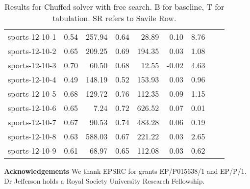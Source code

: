\documentclass[runningheads]{llncs}
\newcommand{\comment}[1]{}
\begin{document}
\begin{table}[ht]
\begin{tabular}{lrrrrrrll}
 sports-12-10-1 & 0.54 & 257.94 & 0.64 & 28.89 & 0.10 & 8.76 &   &   \\ 
 sports-12-10-2 & 0.65 & 209.25 & 0.69 & 194.35 & 0.03 & 1.08 &   &   \\ 
 sports-12-10-3 & 0.70 & 60.50 & 0.68 & 12.55 & -0.02 & 4.63 &   &   \\ 
 sports-12-10-4 & 0.49 & 148.19 & 0.52 & 153.93 & 0.03 & 0.96 &   &   \\ 
 sports-12-10-5 & 0.68 & 129.72 & 0.76 & 112.35 & 0.09 & 1.15 &   &   \\ 
 sports-12-10-6 & 0.65 & 7.24 & 0.72 & 626.52 & 0.07 & 0.01 &   &   \\ 
 sports-12-10-7 & 0.67 & 90.53 & 0.74 & 483.28 & 0.06 & 0.19 &   &   \\ 
 sports-12-10-8 & 0.63 & 588.03 & 0.67 & 221.22 & 0.03 & 2.65 &   &   \\ 
 sports-12-10-9 & 0.61 & 68.97 & 0.65 & 112.08 & 0.03 & 0.62 &   &   \\ 
   \hline
\end{tabular}
\caption{Results for Chuffed solver with free search. B for baseline, T for tabulation. SR refers to Savile Row.}\label{tab-chuf}
\end{table}



\noindent\textbf{Acknowledgements}
We thank EPSRC for grants
EP/P015638/1\comment{pipeline} and EP/P/1\comment{graphs}.
Dr Jefferson holds a Royal Society University Research Fellowship.



\end{document}
